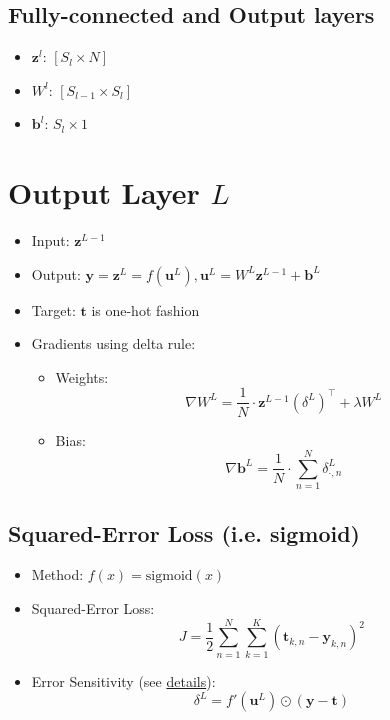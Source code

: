 \documentclass[11pt]{article}
\begin{document}
\subsection{Fully-connected and Output layers}
\label{sec-2-2}
\begin{itemize}
\item \(\mathbf{z}^{l}\): \([S_{l} \times N]\)
\item \(W^{l}\): \([S_{l-1} \times S_{l}]\)
\item \(\mathbf{b}^{l}\): \(S_{l} \times 1\)
\end{itemize}

\section{Output Layer \(L\)}
\label{sec-3}
\begin{itemize}
\item Input: \(\mathbf{z}^{L-1}\)
\item Output: \(\mathbf{y} = \mathbf{z}^{L} = f(\mathbf{u}^{L}), \mathbf{u}^{L} = W^{L}\mathbf{z}^{L-1} + \mathbf{b}^{L}\)
\item Target: \(\mathbf{t}\) is one-hot fashion
\item Gradients using delta rule:
\begin{itemize}
\item Weights: \[ \nabla W^{L} = \frac{1}{N} \cdot \mathbf{z}^{L-1} (\delta^{L})^{\top} + \lambda W^{L}\]
\item Bias: \[ \nabla \mathbf{b}^{L} = \frac{1}{N} \cdot  \sum_{n=1}^{N} \delta^{L}_{\cdot, n} \]
\end{itemize}
\end{itemize}

\subsection{Squared-Error Loss (i.e. sigmoid)}
\label{sec-3-1}
\begin{itemize}
\item Method: \(f(x) = \mathrm{sigmoid}(x)\)
\item Squared-Error Loss: \[ J = \frac{1}{2} \sum_{n=1}^{N} \sum_{k=1}^{K} (\mathbf{t}_{k,n} - \mathbf{y}_{k,n})^{2}\]
\item Error Sensitivity (see \href{http://www.cnblogs.com/tornadomeet/p/3468450.html}{details}): \[ \delta^{L} = f'(\mathbf{u}^{L}) \odot (\mathbf{y} - \mathbf{t}) \]
\end{itemize}
\end{document}
